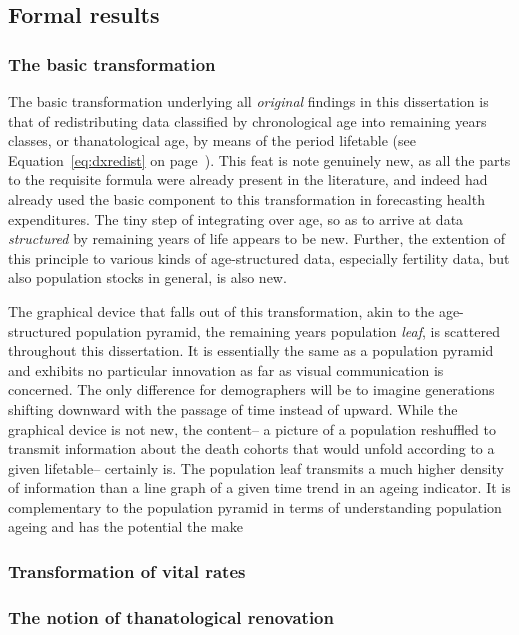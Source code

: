 
\subsection{Formal results}

\subsubsection{The basic transformation}
The basic transformation underlying all \textit{original} findings in this
dissertation is that of redistributing data classified by chronological age into
remaining years classes, or thanatological age, by means of the period
lifetable (see Equation~\eqref{eq:dxredist} on page~\pageref{eq:dxredist}). This
feat is note genuinely new, as all the parts to the requisite formula were 
already present in the literature, and indeed \citep{miller2001increasing} had
already used the basic component to this transformation in forecasting health
expenditures. The tiny step of integrating over age, so as to arrive at data
\textit{structured} by remaining years of life appears to be new. Further, the
extention of this principle to various kinds of age-structured data, especially
fertility data, but also population stocks in general, is also new.

The graphical device that falls out of this transformation,
akin to the age-structured population pyramid, the remaining years population
\textit{leaf}, is scattered throughout this dissertation. It is essentially the
same as a population pyramid and exhibits no particular innovation as far as
visual communication is concerned. The only difference for demographers will be
to imagine generations shifting downward with the passage of time instead of
upward. While the graphical device is not new, the content-- a picture of a
population reshuffled to transmit information about the death cohorts that would
unfold according to a given lifetable-- certainly is. The population leaf
transmits a much higher density of information than a line graph of a given time
trend in an ageing indicator. It is complementary to the population pyramid in
terms of understanding population ageing and has the potential the make


\subsubsection{Transformation of vital rates}
\subsubsection{The notion of thanatological renovation}
